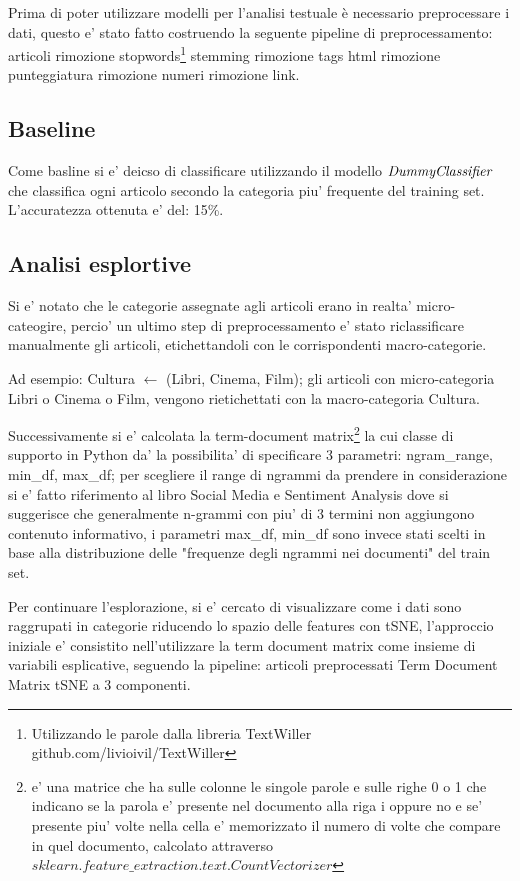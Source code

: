\documentclass[runningheads]{llncs}
\begin{document}
Prima di poter utilizzare modelli per l'analisi testuale è necessario preprocessare i dati,
questo e' stato fatto costruendo la seguente pipeline di preprocessamento: articoli \textpipe  rimozione stopwords\footnote{Utilizzando le parole dalla libreria TextWiller github.com/livioivil/TextWiller} \textpipe  stemming \textpipe rimozione tags html \textpipe rimozione punteggiatura \textpipe rimozione numeri \textpipe rimozione link.


\subsection{Baseline}
\label{sec:baseline}

Come basline si e' deicso di classificare utilizzando il modello $\it DummyClassifier$ che classifica ogni articolo secondo la categoria piu' frequente del training set. L'accuratezza ottenuta e' del: 15\%.


\subsection{Analisi esplortive}
Si e' notato che le categorie assegnate agli articoli erano in realta' micro-cateogire, percio' un ultimo step 
di preprocessamento e' stato riclassificare manualmente gli articoli, etichettandoli con le corrispondenti macro-categorie.

Ad esempio: Cultura $\leftarrow $ (Libri, Cinema, Film); gli articoli con micro-categoria Libri o Cinema o Film, vengono rietichettati con la macro-categoria Cultura.

Successivamente si e' calcolata la term-document matrix\footnote{e' una matrice che ha sulle colonne le singole parole e sulle righe 0 o 1 che indicano se la parola e' presente nel documento alla riga i oppure no e se' presente piu' volte nella cella e' memorizzato il numero di volte che compare in quel documento, calcolato attraverso    $sklearn.feature\_extraction.text.CountVectorizer$}  la cui classe di supporto in Python da' la possibilita' di specificare 3 parametri: ngram\_range, min\_df, max\_df; per scegliere il
range di ngrammi da prendere in considerazione si e' fatto riferimento al libro Social Media e Sentiment Analysis\cite{NGRAM} dove si suggerisce che generalmente n-grammi con piu' di 3 termini non aggiungono contenuto informativo, i parametri max\_df, min\_df sono invece stati scelti in base alla distribuzione delle "frequenze degli ngrammi nei documenti" del train set.


Per continuare l'esplorazione, si e' cercato di visualizzare come i dati sono raggrupati in categorie riducendo lo spazio delle features con tSNE, l'approccio iniziale e' consistito nell'utilizzare la term document matrix
come insieme di variabili esplicative, seguendo la pipeline: articoli preprocessati \textpipe Term Document Matrix \textpipe tSNE a 3 componenti.
\end{document}
